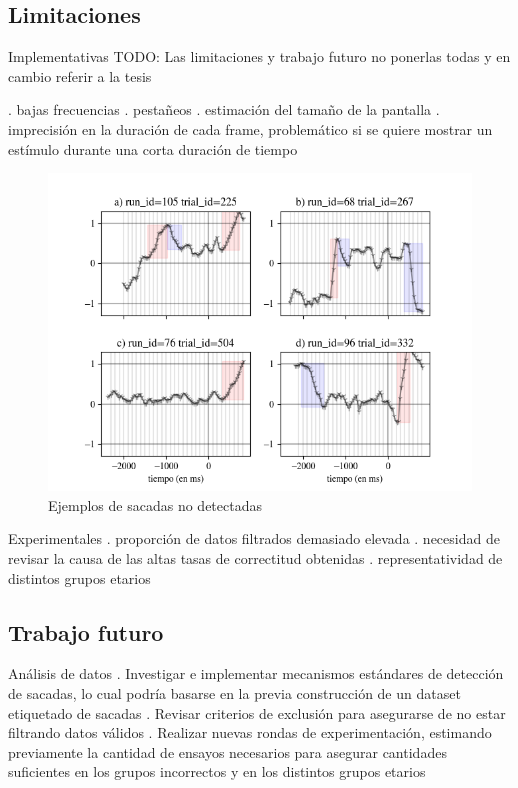 \documentclass[aspectratio=169]{beamer}
\begin{document}
\subsection{Limitaciones}

\begin{frame}{Implementativas}
  TODO: Las limitaciones y trabajo futuro no ponerlas todas y en cambio referir
  a la tesis \par

. bajas frecuencias
. pestañeos
. estimación del tamaño de la pantalla
. imprecisión en la duración de cada frame, problemático si se quiere mostrar
  un estímulo durante una corta duración de tiempo

  \begin{figure}
    \centering
    \includegraphics[width=0.9\linewidth]{img/undetected-saccades-examples.png}
    \caption{Ejemplos de sacadas no detectadas}
  \end{figure}
\end{frame}

\begin{frame}{Experimentales}
. proporción de datos filtrados demasiado elevada
. necesidad de revisar la causa de las altas tasas de correctitud obtenidas
. representatividad de distintos grupos etarios
\end{frame}

\subsection{Trabajo futuro}

\begin{frame}{Análisis de datos}
. Investigar e implementar mecanismos estándares de detección de sacadas, lo
  cual podría basarse en la previa construcción de un dataset etiquetado de
  sacadas
. Revisar criterios de exclusión para asegurarse de no estar filtrando datos
  válidos
. Realizar nuevas rondas de experimentación, estimando previamente la cantidad
  de ensayos necesarios para asegurar cantidades suficientes en los grupos
  incorrectos y en los distintos grupos etarios
\end{frame}
\end{document}

